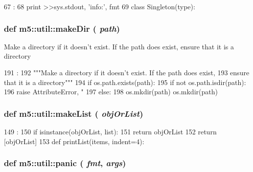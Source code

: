 \begin{DoxyCode}
67                       :
68     print >>sys.stdout, 'info:', fmt %
69 
class Singleton(type):
\end{DoxyCode}
\hypertarget{namespacem5_1_1util_a25ec95943ee170ca910bafa9376613ff}{
\subsubsection[{makeDir}]{\setlength{\rightskip}{0pt plus 5cm}def m5::util::makeDir ( {\em path})}}
\label{namespacem5_1_1util_a25ec95943ee170ca910bafa9376613ff}
\begin{DoxyVerb}Make a directory if it doesn't exist.  If the path does exist,
ensure that it is a directory\end{DoxyVerb}
 


\begin{DoxyCode}
191                  :
192     """Make a directory if it doesn't exist.  If the path does exist,
193     ensure that it is a directory"""
194     if os.path.exists(path):
195         if not os.path.isdir(path):
196             raise AttributeError, "%
197     else:
198         os.mkdir(path)
        os.mkdir(path)
\end{DoxyCode}
\hypertarget{namespacem5_1_1util_a21a8ae7bb1334e05e9b870de5f0675f8}{
\subsubsection[{makeList}]{\setlength{\rightskip}{0pt plus 5cm}def m5::util::makeList ( {\em objOrList})}}
\label{namespacem5_1_1util_a21a8ae7bb1334e05e9b870de5f0675f8}



\begin{DoxyCode}
149                        :
150     if isinstance(objOrList, list):
151         return objOrList
152     return [objOrList]
153 
def printList(items, indent=4):
\end{DoxyCode}
\hypertarget{namespacem5_1_1util_aa2cb9615f3da634982552408620a1b99}{
\subsubsection[{panic}]{\setlength{\rightskip}{0pt plus 5cm}def m5::util::panic ( {\em fmt}, \/   {\em args})}}
\label{namespacem5_1_1util_aa2cb9615f3da634982552408620a1b99}



